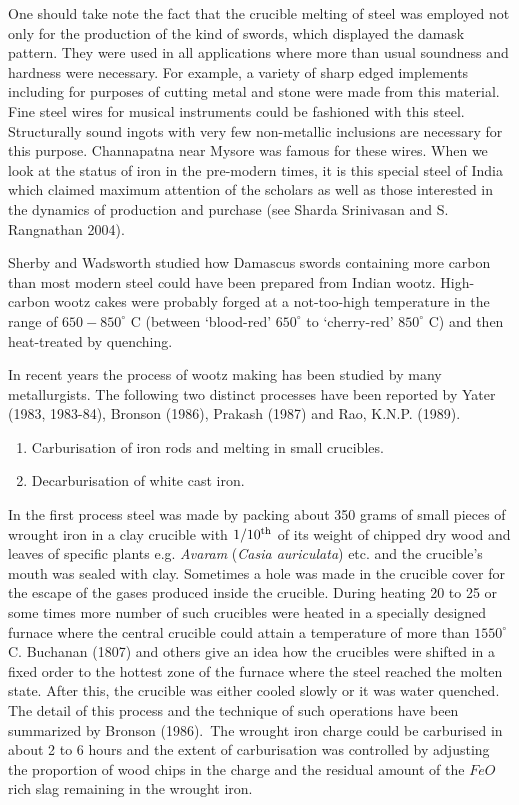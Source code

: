 One should take note the fact that the crucible melting of steel was employed not only for the production of the kind of swords, which displayed the damask pattern. They were used in all applications where more than usual soundness and hardness were necessary. For example, a variety of sharp edged implements including for purposes of cutting metal and stone were made from this material. Fine steel wires for musical instruments could be fashioned with this steel. Structurally sound ingots with very few non-metallic inclusions are necessary for this purpose. Channapatna near Mysore was famous for these wires. When we look at the status of iron in the pre-modern times, it is this special steel of India which claimed maximum attention of the scholars as well as those interested in the dynamics of production and purchase (see Sharda Srinivasan and S. Rangnathan 2004).

Sherby and Wadsworth studied how Damascus swords containing more carbon than most modern steel could have been prepared from Indian wootz. High-carbon wootz cakes were probably forged at a not-too-high temperature in the range of $650-850^\circ$ C (between ‘blood-red’ $650^\circ$ to ‘cherry-red’ $850^\circ$ C) and then heat-treated by quenching. 

In recent years the process of wootz making has been studied by many metallurgists. The following two distinct processes have been reported by 
Yater (1983, 1983-84), Bronson (1986), Prakash (1987) and Rao, K.N.P. (1989).
\begin{enumerate}
\item Carburisation of iron rods and melting in small crucibles.
\item Decarburisation of white cast iron.
\end{enumerate}

In the first process steel was made by packing about 350 grams of small pieces of wrought iron in a clay crucible with $1/10^{\rm th}$ of its weight of chipped dry wood and leaves of specific plants e.g. {\it Avaram} ({\it Casia auriculata}) etc. and the crucible's mouth was sealed with clay. Sometimes a hole was made in the crucible cover for the escape of the gases produced inside the crucible. During heating 20 to 25 or some times more number of such crucibles were heated in a specially designed furnace where the central crucible could attain a temperature of more than $1550^\circ$C. Buchanan (1807) and others give an idea how the crucibles were shifted in a fixed order to the hottest zone of the furnace where the steel reached the molten state. After this, the crucible was either cooled slowly or it was water quenched. The detail of this process and the technique of such operations have been summarized by Bronson (1986).~The wrought iron charge could be carburised in about 2 to 6 hours and the extent of carburisation was controlled by adjusting the proportion of wood chips in the charge and the residual amount of the $FeO$ rich slag remaining in the wrought iron.

